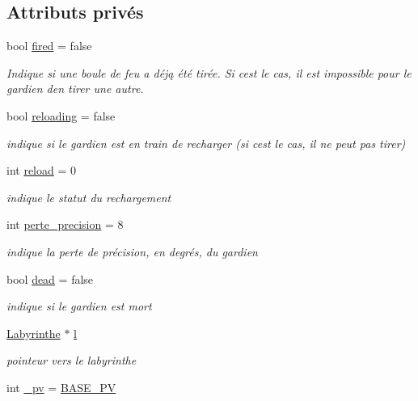 \subsection*{Attributs privés}
\begin{DoxyCompactItemize}
\item 
bool \hyperlink{classGardien_a8ca3f9b553e9248f36735dde604fd756}{fired} = false
\begin{DoxyCompactList}\small\item\em Indique si une boule de feu a déją été tirée. Si c\textquotesingle{}est le cas, il est impossible pour le gardien d\textquotesingle{}en tirer une autre. \end{DoxyCompactList}\item 
bool \hyperlink{classGardien_aabac0fd95b26fdafba349c911542311a}{reloading} = false
\begin{DoxyCompactList}\small\item\em indique si le gardien est en train de recharger (si c\textquotesingle{}est le cas, il ne peut pas tirer) \end{DoxyCompactList}\item 
int \hyperlink{classGardien_a58cdd1f05ebd54e3f638b69e4978837d}{reload} = 0
\begin{DoxyCompactList}\small\item\em indique le statut du rechargement \end{DoxyCompactList}\item 
int \hyperlink{classGardien_a5d7e6815e221a4c2038efaf6e8ba9d2e}{perte\+\_\+precision} = 8
\begin{DoxyCompactList}\small\item\em indique la perte de précision, en degrés, du gardien \end{DoxyCompactList}\item 
bool \hyperlink{classGardien_ad418641d97373fb9304fc76f78c817ac}{dead} = false
\begin{DoxyCompactList}\small\item\em indique si le gardien est mort \end{DoxyCompactList}\item 
\hyperlink{classLabyrinthe}{Labyrinthe} $\ast$ \hyperlink{classGardien_a6a2c6e6cba4cf4e760ee8509d72f0f98}{l}
\begin{DoxyCompactList}\small\item\em pointeur vers le labyrinthe \end{DoxyCompactList}\item 
int \hyperlink{classGardien_a252683c50522c13f9604bea387d1af34}{\+\_\+pv} = \hyperlink{classGardien_a1832c02b32c6e47b240536fd6ba47812}{B\+A\+S\+E\+\_\+\+PV}

\end{DoxyCompactItemize}
